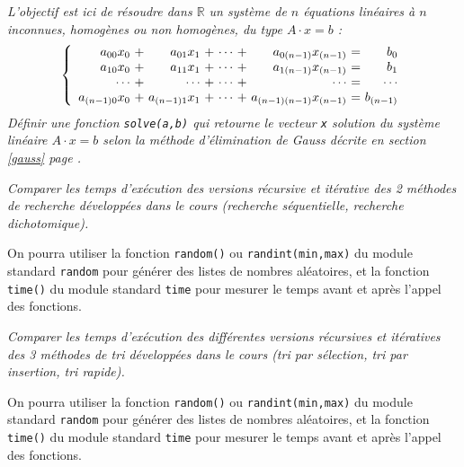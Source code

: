 \begin{td}\label{td:gauss}
\em
L'objectif est ici de 
résoudre dans $\mathbb{R}$ un système de $n$ équations linéaires
à $n$ inconnues, homogènes ou non homogènes, du type $A\cdot x = b$ :
$$\left\{
\begin{array}{r@{\ +\ }r@{\ +\ }r@{\ +\ }r@{\ =\ }r}
a_{00}x_0     & a_{01}x_1     & \cdots & a_{0(n-1)}x_{(n-1)}     & b_0      \\
a_{10}x_0     & a_{11}x_1     & \cdots & a_{1(n-1)}x_{(n-1)}     & b_1      \\
\cdots        & \cdots        & \cdots & \cdots                  & \cdots   \\
a_{(n-1)0}x_0 & a_{(n-1)1}x_1 & \cdots & a_{(n-1)(n-1)}x_{(n-1)} & b_{(n-1)}
\end{array}
\right.$$
Définir une fonction {\tt solve(a,b)} qui retourne le vecteur {\tt x}
solution du système linéaire $A\cdot x = b$ selon la méthode d'élimination de 
{\sc Gauss} décrite en section \ref{gauss} page \pageref{gauss}.
\end{td}


\begin{td}\label{td:exectri2}
\em
Comparer les temps d'exécution des versions récursive et itérative des
2 méthodes de recherche développées dans le cours (recherche séquentielle, recherche dichotomique).

On pourra utiliser la fonction {\tt random()} ou {\tt randint(min,max)} du module standard
{\tt random} pour générer des listes de nombres aléatoires, et la fonction {\tt time()}
du module standard {\tt time} pour mesurer le temps avant et après l'appel des
fonctions.
\end{td}

\begin{td}\label{td:exectri3}
\em
Comparer les temps d'exécution des différentes versions récursives et itératives des
3 méthodes de tri développées dans le cours (tri par sélection, tri par insertion, tri rapide).

On pourra utiliser la fonction {\tt random()} ou {\tt randint(min,max)} du module standard
{\tt random} pour générer des listes de nombres aléatoires, et la fonction {\tt time()}
du module standard {\tt time} pour mesurer le temps avant et après l'appel des
fonctions.
\end{td}
